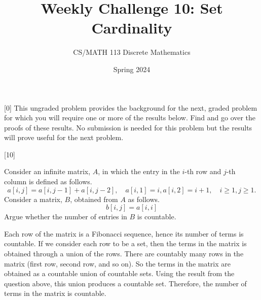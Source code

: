 \documentclass[a4paper]{exam}
\title{Weekly Challenge 10: Set Cardinality}
\author{CS/MATH 113 Discrete Mathematics}
\date{Spring 2024}
\begin{document}
\maketitle

\begin{questions}

[0]
  This ungraded problem provides the background for the next, graded problem for which you will require one or more of the results below. Find and go over the proofs of these results. No submission is needed for this problem but the results will prove useful for the next problem.
  


[10]

  Consider an infinite matrix, $A$, in which the entry in the $i$-th row and $j$-th column is defined as follows.
  \[
    a[i,j] = a[i,j-1] + a[i,j-2], \quad a[i,1] = i, a[i,2] = i+1, \quad i\geq 1, j\geq 1.
  \]
  Consider a matrix, $B$, obtained from $A$ as follows.
  \[
    b[i,j]= a[i,i]
  \]
  Argue whether the number of entries in $B$ is countable.
  
    \begin{solution}
    Each row of the matrix is a Fibonacci sequence, hence its number of terms is countable.
If we consider each row to be a set, then the terms in the matrix is obtained through a union of the rows.
There are countably many rows in the matrix (first row, second row, and so on).
So the terms in the matrix are obtained as a countable union of countable sets.
Using the result from the question above, this union produces a countable set.
Therefore, the number of terms in the matrix is countable.
    \end{solution}

\end{questions}
\end{document}
